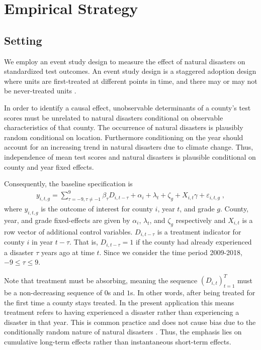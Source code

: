 
\section{Empirical Strategy}

\subsection{Setting}

We employ an event study design to measure the effect of natural disasters on standardized test outcomes. An event study design is a staggered adoption design where units are first-treated at different points in time, and there may or may not be never-treated units \citep{Sun_2021}.

In order to identify a causal effect, unobservable determinants of a county's test scores must be unrelated to natural disasters conditional on observable characteristics of that county. The occurrence of natural disasters is plausibly random conditional on location. Furthermore conditioning on the year should account for an increasing trend in natural disasters due to climate change. Thus, independence of mean test scores and natural disasters is plausible conditional on county and year fixed effects.

Consequently, the baseline specification is
\begin{align} \label{baseline}
	y_{i, t, g} = \sum_{\tau = -9, \tau \neq -1}^{9} \beta_\tau D_{i, t-\tau} + \alpha_i + \lambda_t + \zeta_g + X_{i, t} \gamma + \varepsilon_{i, t, g} \;,
\end{align}
where $y_{i, t, g}$ is the outcome of interest for county $i$, year $t$, and grade $g$. County, year, and grade fixed-effects are given by $\alpha_i$, $\lambda_t$, and $\zeta_g$ respectively and $X_{i, t}$ is a row vector of additional control variables. $D_{i, t-\tau}$ is a treatment indicator for county $i$ in year $t-\tau$. That is, $D_{i, t-\tau} = 1$ if the county had already experienced a disaster $\tau$ years ago at time $t$. Since we consider the time period 2009-2018, $-9 \leq \tau \leq 9$.

Note that treatment must be absorbing, meaning the sequence $(D_{i, t})_{t=1}^T$ must be a non-decreasing sequence of $0$s and $1$s. In other words, after being treated for the first time a county stays treated. In the present application this means treatment refers to having experienced a disaster rather than experiencing a disaster in that year. This is common practice and does not cause bias due to the conditionally random nature of natural disasters \citep{Deryugina_2017}. Thus, the emphasis lies on cumulative long-term effects rather than instantaneous short-term effects.

